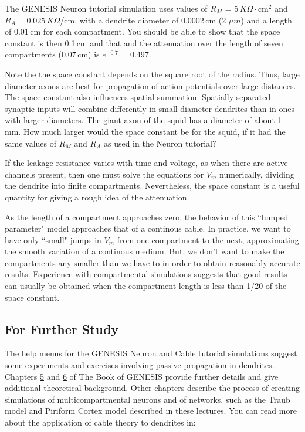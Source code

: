 \documentclass[12pt]{article}
\begin{document}
The GENESIS Neuron tutorial simulation uses values of $R_M$ = 5\,$K\Omega\cdot$cm$^2$ and $R_A = 0.025\,K\Omega$/cm, with a dendrite diameter of 0.0002\,cm (2 $\mu m$) and a length of 0.01\,cm for each compartment. You should be able to show that the space constant is then 0.1\,cm and that and the attenuation over the length of seven compartments (0.07\,cm) is $e^{-0.7}$ = 0.497.

Note the the space constant depends on the square root of the radius. Thus, large diameter axons are best for propagation of action potentials over large distances. The space constant also influences spatial summation. Spatially separated synaptic inputs will combine differently in small diameter dendrites than in ones with larger diameters. The giant axon of the squid has a diameter of about 1 mm. How much larger would the space constant be for the squid, if it had the same values of $R_M$ and $R_A$ as used in the Neuron tutorial?

If the leakage resistance varies with time and voltage, as when there are active channels present, then one must solve the equations for $V_m$ numerically, dividing the dendrite into finite compartments. Nevertheless, the space constant is a useful quantity for giving a rough idea of the attenuation.

As the length of a compartment approaches zero, the behavior of this ``lumped parameter" model approaches that of a continous cable. In practice, we want to have only ``small" jumps in $V_m$ from one compartment to the next, approximating the smooth variation of a continous medium. But, we don't want to make the compartments any smaller than we have to in order to obtain reasonably accurate results. Experience with compartmental simulations suggests that good results can usually be obtained when the compartment length is less than 1/20 of the space constant.

\subsection*{For Further Study}

The help menus for the GENESIS Neuron and Cable tutorial simulations suggest some experiments and exercises involving passive propagation in dendrites. Chapters \href{../bog-ch5/bog-ch5.pdf}{5} and \href{../bog-ch6/bog-ch6.pdf}{6} of The Book of GENESIS provide further details and give additional theoretical background. Other chapters describe the process of creating simulations of multicompartmental neurons and of networks, such as the Traub model and Piriform Cortex model described in these lectures. You can read more about the application of cable theory to dendrites in:
\end{document}
